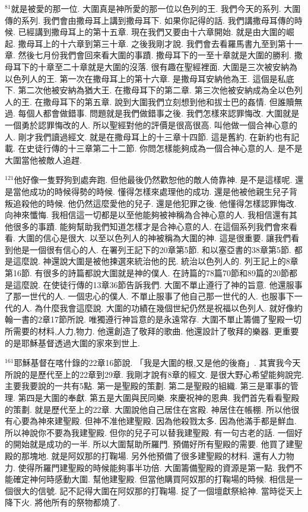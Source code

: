 \documentclass{book}
\begin{document}
$^{81}$就是被愛的那一位.
大圍真是神所愛的那一位以色列的王.
我們今天的系列.
大圍傳的系列.
我們會由撒母耳上講到撒母耳下.
如果你記得的話.
我們講撒母耳傳的時候.
已經講到撒母耳上的第十五章.
現在我們又要由十六章開始.
就是由大圍的崛起.
撒母耳上的十六章到第三十章.
之後我剛才說.
我們會去看羅馬書九至到第十一章.
然後七月份我們會回來看大圍的事蹟.
撒母耳下的一至十章就是大圍的勝利.
撒母耳下的十章至二十章就是大圍的沒落.
很有趣在聖經裡面.
大圍是三次被安納為以色列人的王.
第一次在撒母耳上的第十六章.
是撒母耳安納他為王.
這個是私底下.
第二次他被安納為猶大王.
在撒母耳下的第二章.
第三次他被安納成為全以色列人的王.
在撒母耳下的第五章.
說到大圍我們立刻想到他和拔士巴的姦情.
但誰贖無過.
每個人都會做錯事.
問題就是我們做錯事之後.
我們怎樣來認罪悔改.
大圍就是一個勇於認罪悔改的人.
所以聖經對他的評價是很高很高.
叫他做一個合神心意的人.
剛才我們讀過經文.
就是在撒母耳上的十三章十四節.
這是舊約.
在新約也有記載.
在史徒行傳的十三章第二十二節.
你問怎樣能夠成為一個合神心意的人.
是不是大圍當他被敵人追趕.

$^{121}$他好像一隻野狗到處奔跑.
但他最後仍然歡恕他的敵人倚靠神.
是不是這樣呢.
還是當他成功的時候得勢的時候.
懂得怎樣來處理他的成功.
還是他被他親生兒子背叛追殺他的時候.
他仍然這麼愛他的兒子.
還是他犯罪之後.
他懂得怎樣認罪悔改.
向神來懺悔.
我相信這一切都是以至他能夠被神稱為合神心意的人.
我相信還有其他很多的事蹟.
能夠幫助我們知道怎樣才是合神心意的人.
在這個系列我們會來看看.
大圍的信心是很大.
以至以色列人的神被稱為大圍的神.
這是很重要.
讓我們看到他是一個很有信心的人.
在署列王記下的20章第5節.
和以塞亞書的38章第5節.
都是這麼說.
神還說大圍是被他揀選來統治他的民.
統治以色列人的.
列王記上的8章第16節.
有很多的詩篇都說大圍就是神的僕人.
在詩篇的78篇70節和89篇的20節都是這麼說.
在使徒行傳的13章36節告訴我們.
大圍不單止遵行了神的旨意.
他還服事了那一世代的人.
一個忠心的僕人.
不單止服事了他自己那一世代的人.
也服事下一代的人.
為什麼我會這麼說.
大圍的功績在幾個世紀仍然是祝福以色列人.
就好像約翰一書的2章17節所說.
唯獨遵行神旨意的是永遠常存.
大圍不單止籌備了聖殿一切所需要的材料,人力,物力.
他還創造了敬拜的歌曲.
他還設計了敬拜的樂器.
更重要的是耶穌基督透過大圍的家來到世上.

$^{161}$耶穌基督在喀什錄的22章16節說.
「我是大圍的根,又是他的後裔」.
其實我今天所說的是歷代至上的22章到29章.
我剛才說有8章的經文.
是很大野心希望能夠說完.
主要我要說的一共有5點.
第一是聖殿的策劃.
第二是聖殿的組織.
第三是軍事的管理.
第四是大圍的奉獻.
第五是大圍與民同樂.
來慶祝神的恩典.
我們首先看看聖殿的策劃.
就是歷代至上的22章.
大圍說他自己居住在宮殿.
神居住在帳棚.
所以他很有心要為神來建聖殿.
但神不准他建聖殿.
因為他殺戮太多.
因為他滿手都是鮮血.
所以神說你不要為我建聖殿.
但你的兒子可以替我建聖殿.
有一句古老的話.
一個好的開始就是成功的一半.
所以大圍幫助所羅門.
預備好所有聖殿的需要.
他買了建聖殿的那塊地.
就是阿奴那的打鞠場.
另外他預備了很多建聖殿的材料.
還有人力物力.
使得所羅門建聖殿的時候能夠事半功倍.
大圍籌備聖殿的資源是第一點.
我們不能確定神何時感動大圍.
幫他建聖殿.
但當他購買阿奴那的打鞠場的時候.
相信是一個很大的信號.
記不記得大圍在阿奴那的打鞠場.
捉了一個壇獻祭給神.
當時從天上降下火.
將他所有的祭物都燒了.
\end{document}
